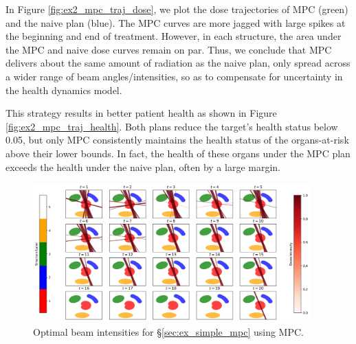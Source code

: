 \documentclass[12pt]{article}
\begin{document}
In Figure \ref{fig:ex2_mpc_traj_dose}, we plot the dose trajectories of MPC (green) and the naive plan (blue). The MPC curves are more jagged with large spikes at the beginning and end of treatment. %
However, in each structure, the area under the MPC and naive dose curves remain on par.
Thus, we conclude that MPC delivers about the same amount of radiation as the naive plan, only spread across a wider range of beam angles/intensities, so as to compensate for uncertainty in the health dynamics model.

This strategy results in better patient health as shown in Figure \ref{fig:ex2_mpc_traj_health}. Both plans reduce the target's health status below 0.05, but only MPC consistently maintains the health status of the organs-at-risk above their lower bounds. In fact, the health of these organs under the MPC plan exceeds the health under the naive plan, often by a large margin. 

\begin{figure}
	\begin{center}
		\includegraphics[width=0.95\textwidth]{figures/ex2_mpc_beams.png}
	\end{center}
	\caption{Optimal beam intensities for \S\ref{sec:ex_simple_mpc} using MPC.}
	\label{fig:ex2_mpc_beams}
\end{figure}
\end{document}
